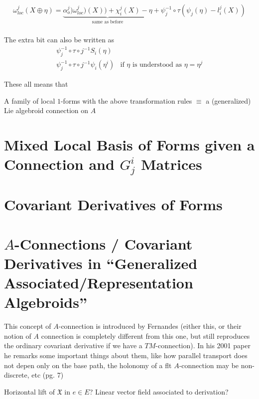 {\begin{align}
\omega^j_{loc}(X \oplus \eta) 
 = \underbrace{\alpha^j_o)\omega^j_{loc})(X)) + \chi^j_i(X) - \eta}_{\text{same as before}} + \psi_j^{-1}\circ \tau (\psi_j(\eta) - l^j_i(X))\\
\end{align}

The extra bit can also be written as 
\begin{align}
    \psi_j^{-1}\circ \tau \circ j^{-1}S_i(\eta) \\
    \psi_j^{-1}\circ \tau \circ j^{-1}\psi_i(\eta^i) & \text{if $\eta$ is understood as $\eta = \eta^j$}
\end{align}

These all means that
\begin{proposition}
A family of local $1$-forms with the above transformation rules $\equiv$ a (generalized) Lie algebroid connection on $A$
\end{proposition}

\linea

\section*{Mixed Local Basis of Forms given a Connection and $G^i_j$ Matrices}

\section*{Covariant Derivatives of Forms}

\section{$A$-Connections / Covariant Derivatives in ``Generalized Associated/Representation Algebroids''}

This concept of $A$-connection is introduced by Fernandes (either this, or their notion of $A$ connection is completely different from this one, but still reproduces the ordinary covariant derivative if we have a $TM$-connection). In his 2001 paper he remarks some important things about them, like how parallel transport does not depen only on the base path, the holonomy of a flt $A$-connection may be non-discrete, etc (pg. 7)

Horizontal lift of $\mathfrak{X}$ in $e\in E$? Linear vector field associated to derivation?


}
